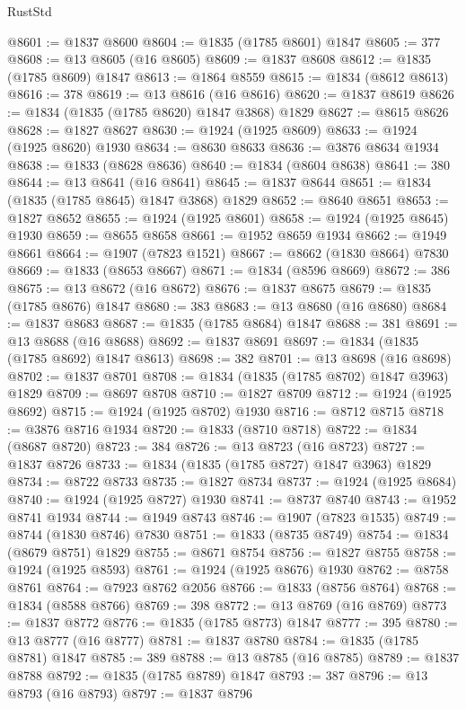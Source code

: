 \begin{lexlean}{RustStd}
\begin{coremodule}
{\begin{coremodule}
{{{{{@8601 := @1837 @8600
@8604 := @1835 (@1785 @8601) @1847
@8605 := 377
@8608 := @13 @8605 (@16 @8605)
@8609 := @1837 @8608
@8612 := @1835 (@1785 @8609) @1847
@8613 := @1864 @8559
@8615 := @1834 (@8612 @8613)
@8616 := 378
@8619 := @13 @8616 (@16 @8616)
@8620 := @1837 @8619
@8626 := @1834 (@1835 (@1785 @8620) @1847 @3868) @1829
@8627 := @8615 @8626
@8628 := @1827 @8627
@8630 := @1924 (@1925 @8609)
@8633 := @1924 (@1925 @8620) @1930
@8634 := @8630 @8633
@8636 := @3876 @8634 @1934
@8638 := @1833 (@8628 @8636)
@8640 := @1834 (@8604 @8638)
@8641 := 380
@8644 := @13 @8641 (@16 @8641)
@8645 := @1837 @8644
@8651 := @1834 (@1835 (@1785 @8645) @1847 @3868) @1829
@8652 := @8640 @8651
@8653 := @1827 @8652
@8655 := @1924 (@1925 @8601)
@8658 := @1924 (@1925 @8645) @1930
@8659 := @8655 @8658
@8661 := @1952 @8659 @1934
@8662 := @1949 @8661
@8664 := @1907 (@7823 @1521)
@8667 := @8662 (@1830 @8664) @7830
@8669 := @1833 (@8653 @8667)
@8671 := @1834 (@8596 @8669)
@8672 := 386
@8675 := @13 @8672 (@16 @8672)
@8676 := @1837 @8675
@8679 := @1835 (@1785 @8676) @1847
@8680 := 383
@8683 := @13 @8680 (@16 @8680)
@8684 := @1837 @8683
@8687 := @1835 (@1785 @8684) @1847
@8688 := 381
@8691 := @13 @8688 (@16 @8688)
@8692 := @1837 @8691
@8697 := @1834 (@1835 (@1785 @8692) @1847 @8613)
@8698 := 382
@8701 := @13 @8698 (@16 @8698)
@8702 := @1837 @8701
@8708 := @1834 (@1835 (@1785 @8702) @1847 @3963) @1829
@8709 := @8697 @8708
@8710 := @1827 @8709
@8712 := @1924 (@1925 @8692)
@8715 := @1924 (@1925 @8702) @1930
@8716 := @8712 @8715
@8718 := @3876 @8716 @1934
@8720 := @1833 (@8710 @8718)
@8722 := @1834 (@8687 @8720)
@8723 := 384
@8726 := @13 @8723 (@16 @8723)
@8727 := @1837 @8726
@8733 := @1834 (@1835 (@1785 @8727) @1847 @3963) @1829
@8734 := @8722 @8733
@8735 := @1827 @8734
@8737 := @1924 (@1925 @8684)
@8740 := @1924 (@1925 @8727) @1930
@8741 := @8737 @8740
@8743 := @1952 @8741 @1934
@8744 := @1949 @8743
@8746 := @1907 (@7823 @1535)
@8749 := @8744 (@1830 @8746) @7830
@8751 := @1833 (@8735 @8749)
@8754 := @1834 (@8679 @8751) @1829
@8755 := @8671 @8754
@8756 := @1827 @8755
@8758 := @1924 (@1925 @8593)
@8761 := @1924 (@1925 @8676) @1930
@8762 := @8758 @8761
@8764 := @7923 @8762 @2056
@8766 := @1833 (@8756 @8764)
@8768 := @1834 (@8588 @8766)
@8769 := 398
@8772 := @13 @8769 (@16 @8769)
@8773 := @1837 @8772
@8776 := @1835 (@1785 @8773) @1847
@8777 := 395
@8780 := @13 @8777 (@16 @8777)
@8781 := @1837 @8780
@8784 := @1835 (@1785 @8781) @1847
@8785 := 389
@8788 := @13 @8785 (@16 @8785)
@8789 := @1837 @8788
@8792 := @1835 (@1785 @8789) @1847
@8793 := 387
@8796 := @13 @8793 (@16 @8793)
@8797 := @1837 @8796
}}}}}
\end{coremodule}}
\end{coremodule}
\end{lexlean}
